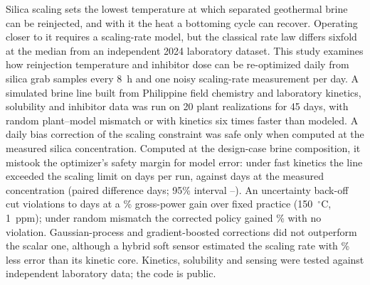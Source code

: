 Silica scaling sets the lowest temperature at which separated geothermal
brine can be reinjected, and with it the heat a bottoming cycle can
recover. Operating closer to it requires a scaling-rate model, but the
classical rate law differs sixfold at the median from an independent
2024 laboratory dataset. This study examines how reinjection temperature
and inhibitor dose can be re-optimized daily from silica grab samples
every 8~h and one noisy scaling-rate measurement per day. A simulated
brine line built from Philippine field chemistry and laboratory
kinetics, solubility and inhibitor data was run on 20 plant
realizations for 45 days, with random plant--model mismatch or with
kinetics six times faster than modeled. A daily bias correction of the
scaling constraint was safe only when computed at the measured silica
concentration. Computed at the design-case brine composition, it
mistook the optimizer's safety margin for model error: under fast
kinetics the line exceeded the scaling limit on  days
per run, against  days at the measured concentration
(paired difference  days; 95\% interval
--). An uncertainty back-off
cut violations to  days at a \%
gross-power gain over fixed practice (150~$^{\circ}$C, 1~ppm); under
random mismatch the corrected policy gained \% with no
violation. Gaussian-process and gradient-boosted corrections did not
outperform the scalar one, although a hybrid soft sensor estimated the
scaling rate with \% less error than its kinetic core.
Kinetics, solubility and sensing were tested against independent
laboratory data; the code is public.
